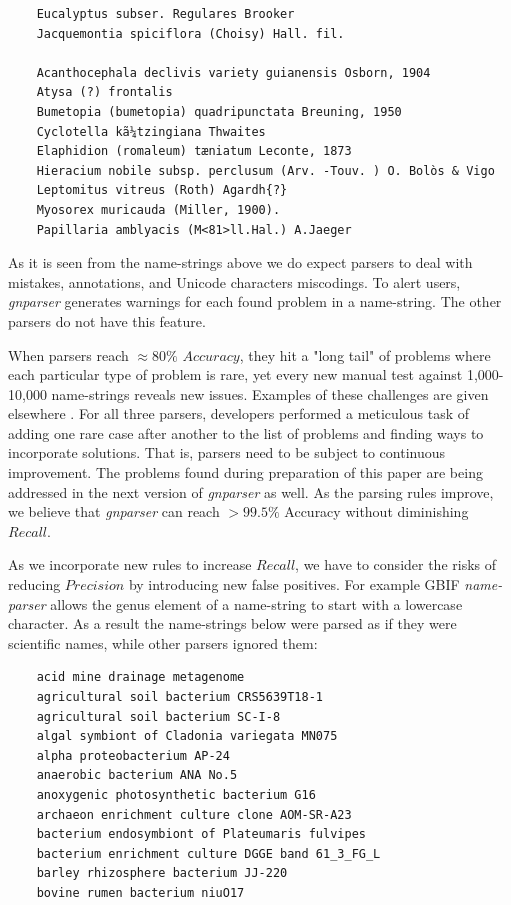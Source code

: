 \documentclass{bmcart}
\begin{document}
\vspace{0.5cm}

\begin{verbatim}
    Eucalyptus subser. Regulares Brooker
    Jacquemontia spiciflora (Choisy) Hall. fil.

    Acanthocephala declivis variety guianensis Osborn, 1904
    Atysa (?) frontalis
    Bumetopia (bumetopia) quadripunctata Breuning, 1950
    Cyclotella kã¼tzingiana Thwaites
    Elaphidion (romaleum) tæniatum Leconte, 1873
    Hieracium nobile subsp. perclusum (Arv. -Touv. ) O. Bolòs & Vigo
    Leptomitus vitreus (Roth) Agardh{?}
    Myosorex muricauda (Miller, 1900).
    Papillaria amblyacis (M<81>ll.Hal.) A.Jaeger
\end{verbatim}

\vspace{0.5cm}

As it is seen from the name-strings above we do expect parsers to deal with
mistakes, annotations, and Unicode characters miscodings. To alert users,
\textit{gnparser} generates warnings for each found problem in a name-string.
The other parsers do not have this feature.

When parsers reach $\approx80\%$ $Accuracy$, they hit a "long tail" of problems
where each particular type of problem  is rare, yet every new manual test
against 1,000-10,000 name-strings reveals new issues.  Examples of these
challenges are given elsewhere \cite{Patterson:inpress-a}. For all three
parsers, developers performed a meticulous task of adding one rare case after
another to the list of problems and finding ways to incorporate solutions. That
is, parsers need to be subject to continuous improvement. The problems found
during preparation of this paper are being addressed in the next version of
\textit{gnparser} as well. As the parsing rules improve, we believe that
\textit{gnparser} can reach $>99.5\%$ Accuracy without diminishing $Recall$.

As we incorporate new rules to increase $Recall$, we have to consider the risks
of reducing $Precision$ by introducing new false positives. For example GBIF
\textit{name-parser} allows the genus element of a name-string to start with a
lowercase character. As a result the name-strings below were parsed as if they
were scientific names, while other parsers ignored them:

\vspace{0.5cm}

\begin{verbatim}
    acid mine drainage metagenome
    agricultural soil bacterium CRS5639T18-1
    agricultural soil bacterium SC-I-8
    algal symbiont of Cladonia variegata MN075
    alpha proteobacterium AP-24
    anaerobic bacterium ANA No.5
    anoxygenic photosynthetic bacterium G16
    archaeon enrichment culture clone AOM-SR-A23
    bacterium endosymbiont of Plateumaris fulvipes
    bacterium enrichment culture DGGE band 61_3_FG_L
    barley rhizosphere bacterium JJ-220
    bovine rumen bacterium niuO17
\end{verbatim}
\end{document}
